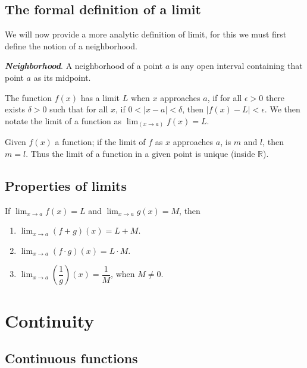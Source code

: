 \documentclass{report}
\begin{document}
\section{The formal definition of a limit}

We will now provide a more analytic definition of limit, for this we must first define the notion of a neighborhood.

\begin{defBox}
    \textit{\textbf{Neighborhood}}. A neighborhood of a point $a$ is any open interval containing that point $a$ as its midpoint.
\end{defBox}

\begin{defBox}
    The function $f(x)$ has a limit $L$ when $x$ approaches $a$, if for all $\epsilon > 0$ there exists $\delta > 0$ such that for all $x$, if $0 < |x-a| <\delta$, then $|f(x)-L| < \epsilon$. We then notate the limit of a function as $\lim_(x \to a) f(x) = L$.
\end{defBox}

\begin{thBox}
    Given $f(x)$ a function; if the limit of $f$ as $x$ approaches $a$, is $m$ and $l$, then $m=l$. Thus the limit of a function in a given point is unique (inside $\mathbb{R}$).
\end{thBox}

\section{Properties of limits}

\begin{thBox}
    If $\lim_{x \to a} f(x) = L$ and $\lim_{x \to a} g(x) = M$, then

    \begin{enumerate}
        \item $\lim_{x \to a} (f + g)(x) = L + M$.
        \item $\lim_{x \to a} (f \cdot g)(x) = L \cdot M$.
        \item $\lim_{x \to a} (\dfrac{1}{g})(x) = \dfrac{1}{M}$, when $M \not = 0$.
    \end{enumerate}
\end{thBox}

\chapter{Continuity}

\section{Continuous functions}
\end{document}
